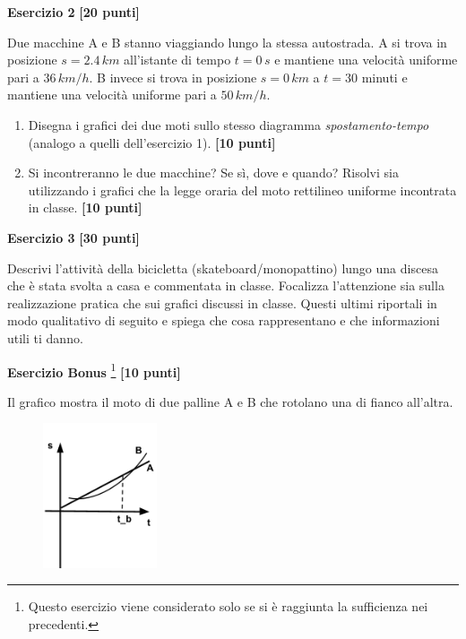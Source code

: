 \documentclass{report} \usepackage[T1]{fontenc} \usepackage[italian]{babel}
\begin{document}
\vspace{10mm}

\noindent\textbf{Esercizio 2} \hfill \textbf{[20 punti]}

\noindent Due macchine A e B stanno viaggiando lungo la stessa autostrada. A si trova in
posizione $s = 2.4\, km$ all’istante di tempo $t = 0\, s$ e mantiene una velocità
uniforme pari a $36\, km/h$. B invece si trova in posizione $s = 0\, km$ a $t = 30$ minuti e
mantiene una velocità uniforme pari a $50\, km/h$.

\begin{enumerate}
\item Disegna i grafici dei due moti sullo stesso diagramma \emph{spostamento-tempo}
(analogo a quelli dell’esercizio 1). \hfill \textbf{[10 punti]}
\item Si incontreranno le due macchine? Se sì, dove e quando? Risolvi sia
utilizzando i grafici che la legge oraria del moto rettilineo
uniforme incontrata in classe. \hfill \textbf{[10 punti]}
\end{enumerate}

\vspace{10mm}

\noindent\textbf{Esercizio 3} \hfill \textbf{[30 punti]}

\noindent Descrivi l’attività della bicicletta (skateboard/monopattino) lungo una
discesa che è stata svolta a casa e commentata in classe. Focalizza l’attenzione sia sulla
realizzazione pratica che sui grafici discussi in classe. Questi ultimi
riportali in modo qualitativo di seguito e spiega che cosa rappresentano e che
informazioni utili ti danno.

\pagebreak

\noindent\textbf{Esercizio Bonus}
\footnote{Questo esercizio viene considerato solo se si è raggiunta la sufficienza nei
precedenti.} \hfill \textbf{[10 punti]}

\noindent Il grafico mostra il moto di due palline A e B che rotolano una di fianco
all’altra.

\begin{figure}[H]
\centering
  \includegraphics[width=0.3\textwidth]{test_images/image4}
\end{figure}
\end{document}
